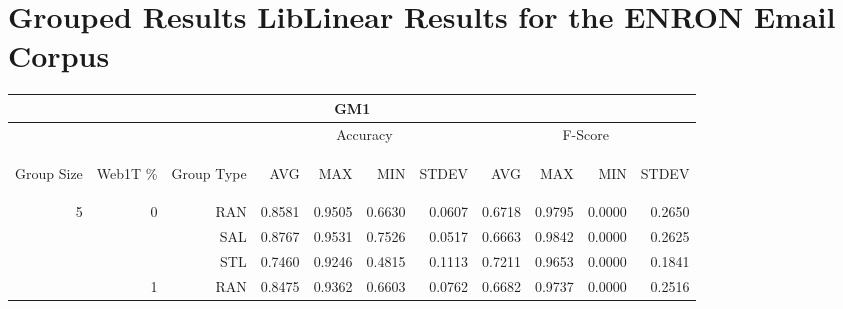 \chapter{Grouped Results LibLinear Results for the ENRON Email Corpus}

\begin{center}
\begin{table}[htbp] 
 \begin{center}
\begin{tabular}{ | r | r | r | r | r | r | r | r | r | r | r |}
\hline
\multicolumn{11}{|c|}{GM1}\\
\hline
 & & & \multicolumn{4}{|c|}{Accuracy} & \multicolumn{4}{|c|}{F-Score}\\ \cline{4-11}
\begin{sideways}Group Size\end{sideways} & \begin{sideways}Web1T \%\end{sideways} & \begin{sideways}Group Type\end{sideways} & \begin{sideways}AVG\end{sideways} & \begin{sideways}MAX\end{sideways} & \begin{sideways}MIN\end{sideways} & \begin{sideways}STDEV\end{sideways} & \begin{sideways}AVG\end{sideways} & \begin{sideways}MAX\end{sideways} & \begin{sideways}MIN\end{sideways} & \begin{sideways}STDEV\end{sideways}\\
\hline
\multirow{18}{*}{5}
 & \multirow{3}{*}{0} & RAN & 0.8581 & 0.9505 & 0.6630 & 0.0607 & 0.6718 & 0.9795 & 0.0000 & 0.2650\\ \cline{3-11}
 &   & SAL & 0.8767 & 0.9531 & 0.7526 & 0.0517 & 0.6663 & 0.9842 & 0.0000 & 0.2625\\ \cline{3-11}
 &   & STL & 0.7460 & 0.9246 & 0.4815 & 0.1113 & 0.7211 & 0.9653 & 0.0000 & 0.1841\\ \cline{2-11}
 & \multirow{3}{*}{1} & RAN & 0.8475 & 0.9362 & 0.6603 & 0.0762 & 0.6682 & 0.9737 & 0.0000 & 0.2516\\ \cline{3-11}

\end{tabular}
\end{center}
\end{table}
\end{center}

